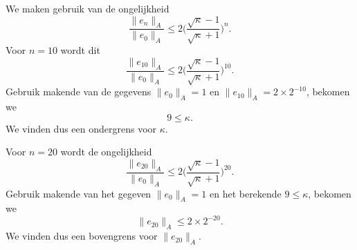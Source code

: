 We maken gebruik van de ongelijkheid
$$ \frac{\lVert e_n \rVert_A}{\lVert e_0 \rVert_A} \leq 2 \bigg(\frac{\sqrt{\kappa}-1}{\sqrt{\kappa}+1}\bigg)^n.$$
Voor $n=10$ wordt dit
$$ \frac{\lVert e_{10} \rVert_A}{\lVert e_0 \rVert_A} \leq 2 \bigg(\frac{\sqrt{\kappa}-1}{\sqrt{\kappa}+1}\bigg)^{10}. $$
Gebruik makende van de gegevens $\lVert e_0 \rVert_A = 1$ en $\lVert e_{10} \rVert_A = 2 \times 2^{-10}$, bekomen we
$$9 \leq \kappa.$$
We vinden dus een ondergrens voor $\kappa$.

Voor $n=20$ wordt de ongelijkheid
$$ \frac{\lVert e_{20} \rVert_A}{\lVert e_0 \rVert_A} \leq 2 \bigg(\frac{\sqrt{\kappa}-1}{\sqrt{\kappa}+1}\bigg)^{20}. $$
Gebruik makende van het gegeven $\lVert e_0 \rVert_A = 1$ en het berekende $9 \leq \kappa$, bekomen we
$$ \lVert e_{20} \rVert_A \leq 2 \times 2^{-20}.$$
We vinden dus een bovengrens voor $ \lVert e_{20} \rVert_A$.